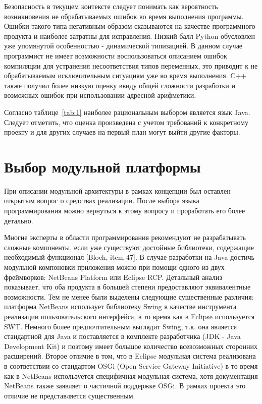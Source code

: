 \documentclass[14pt,oneside,final]{extreport}
\begin{document}
	
	Безопасность в текущем контексте следует понимать как вероятность возникновения не обрабатываемых ошибок во время выполнения программы. Ошибки такого типа негативным образом сказываются на качестве программного продукта и наиболее затратны для исправления. Низкий балл Python обусловлен уже упомянутой особенностью  - динамической типизацией. В данном случае программист не имеет возможности воспользоваться описанием ошибок компиляции для устранения несоответствия типов переменных, это приводит к не обрабатываемым исключительным ситуациям уже во время выполнения. C++ также получил более низкую оценку ввиду общей сложности разработки и возможных ошибок при использовании адресной арифметики.
		
	Согласно таблице~\ref{tab:1} наиболее рациональным выбором является язык Java. Следует отметить, что оценка произведена с учетом требований к конкретному проекту и для других случаев на первый план могут выйти другие факторы.
	
	\section{Выбор модульной платформы}
	
	При описании модульной архитектуры в рамках концепции был оставлен открытым вопрос о средствах реализации. После выбора языка программирования можно вернуться к этому вопросу и проработать его более детально. 
	
	Многие эксперты в области программирования рекомендуют не разрабатывать сложные компоненты, если уже существуют достойные библиотеки, содержащие необходимый функционал [Bloch, item 47]. В случае разработки на Java достичь модульной компоновки приложения можно при помощи одного из двух фреймворков: NetBeans Platform или Eclipse RCP. Детальный анализ показывает, что оба продукта в большей степени предоставляют эквивалентные возможности. Тем не менее были выделены следующие существенные различия: платформа NetBeans использует библиотеку Swing в качестве инструмента реализации пользовательского интерфейса, в то время как в Eclipse используется SWT. Немного более предпочтительным выглядит Swing, т.к. она является стандартной для Java и поставляется в комплекте разработчика (JDK - Java Development Kit) и поэтому имеет большое количество всевозможных сторонних расширений. Второе отличие в том, что в Eclipse модульная система реализована в соответствии со стандартом OSGi (Open Service Gateway Initiative) в то время как в NetBeans используется специфичная модульная система, хотя документация NetBeans также заявляет о частичной поддержке OSGi. В рамках проекта это отличие не представляется существенным. 
	
\end{document}
